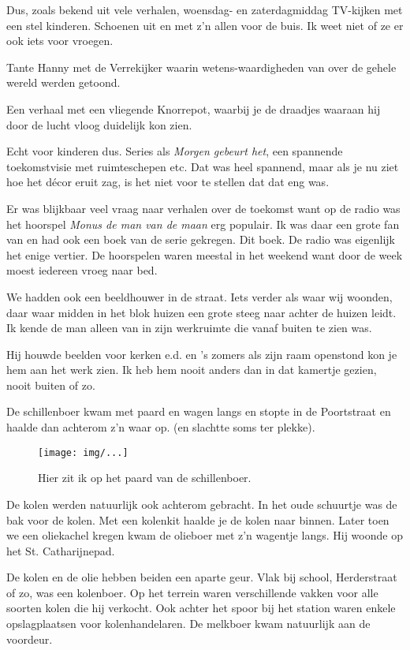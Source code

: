 \documentclass[10pt,twoside,openright]{memoir}
\begin{document}
Dus, zoals bekend uit vele verhalen, woensdag- en zaterdagmiddag TV-kijken met een stel kinderen. Schoenen uit en met z'n allen voor de buis. Ik weet niet of ze er ook iets voor vroegen.

Tante Hanny met de Verrekijker waarin wetens-waardigheden van over de gehele wereld werden getoond. 

Een verhaal met een vliegende Knorrepot, waarbij je de draadjes waaraan hij door de lucht vloog duidelijk kon zien. 

Echt voor kinderen dus. Series als \emph{Morgen gebeurt het}, een spannende toekomstvisie met ruimteschepen etc. Dat was heel spannend, maar als je nu ziet hoe het décor eruit zag, is het niet voor te stellen dat dat eng was.

Er was blijkbaar veel vraag naar verhalen over de toekomst want op de radio was het hoorspel \emph{Monus de man van de maan} erg populair. Ik was daar een grote fan van en had ook een boek van de serie gekregen. Dit boek. De radio was eigenlijk het enige vertier. De hoorspelen waren meestal in het weekend want door de week moest iedereen vroeg naar bed.

We hadden ook een beeldhouwer in de straat. Iets verder als waar wij woonden, daar waar midden in het blok huizen een grote steeg naar achter de huizen leidt. Ik kende de man alleen van in zijn werkruimte die vanaf buiten te zien was. 

Hij houwde beelden voor kerken e.d. en 's zomers als zijn raam openstond kon je hem aan het werk zien. Ik heb hem nooit anders dan in dat kamertje gezien, nooit buiten of zo.

De schillenboer kwam met paard en wagen langs en stopte in de Poortstraat en haalde dan achterom z’n waar op. (en slachtte soms ter plekke). 

\begin{figure}[t]
\texttt{[image: img/...]}
\caption{Hier zit ik op het paard van de schillenboer.}
\end{figure}

De kolen werden natuurlijk ook achterom gebracht. In het oude schuurtje was de bak voor de kolen. Met een kolenkit haalde je de kolen naar binnen. Later toen we een oliekachel kregen kwam de olieboer met z’n wagentje langs. Hij woonde op het St. Catharijnepad.

De kolen en de olie hebben beiden een aparte geur. Vlak bij school, Herderstraat of zo, was een kolenboer. Op het terrein waren verschillende vakken voor alle soorten kolen die hij verkocht. Ook achter het spoor bij het station waren enkele opslagplaatsen voor kolenhandelaren. De melkboer kwam natuurlijk aan de voordeur.
\end{document}
